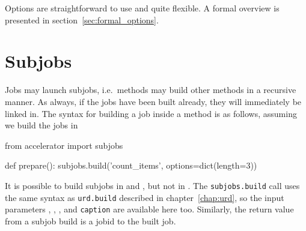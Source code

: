 Options are straightforward to use and quite flexible.  A formal
overview is presented in section~\ref{sec:formal_options}.











\section{Subjobs}
\label{sec:subjobs}

Jobs may launch subjobs, i.e.\ methods may build other methods in a
recursive manner.  As always, if the jobs have been built already,
they will immediately be linked in.  The syntax for building a job
inside a method is as follows, assuming we build the jobs in \prepare
\begin{python}
from accelerator import subjobs

def prepare():
    subjobs.build('count_items', options=dict(length=3))
\end{python}
It is possible to build subjobs in \prepare and \synthesis, but not in
\analysis.    The \texttt{subjobs.build} call uses the
same syntax as \texttt{urd.build} described in chapter~\ref{chap:urd}, so
the input parameters \options, \datasets, \jobids, and
\texttt{caption} are available here too.  Similarly, the return value
from a subjob build is a jobid to the built job.

